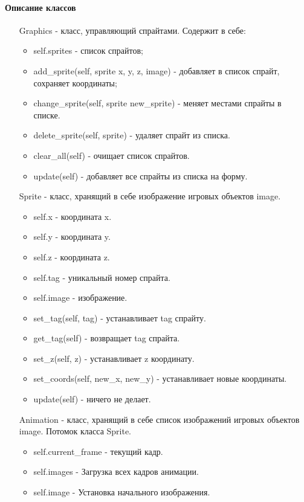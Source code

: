 \paragraph{Описание классов}
\begin{enumerate}
	\item[Graphics] - класс, управляющий спрайтами. Содержит в себе:
	\begin{itemize}
		\item self.sprites - список спрайтов;
		\item add\_sprite(self, sprite x, y, z, image) - добавляет в список спрайт, сохраняет координаты;
		\item change\_sprite(self, sprite new\_sprite) - меняет местами спрайты в списке.
		\item delete\_sprite(self, sprite) - удаляет спрайт из списка.
		\item clear\_all(self) - очищает список спрайтов.
		\item update(self) - добавляет все спрайты из списка на форму.
	\end{itemize}
	\item[Sprite] - класс, хранящий в себе изображение игровых объектов image.
	\begin{itemize}
		\item self.x - координата x.
		\item self.y - координата y.
		\item self.z - координата z.
		\item self.tag - уникальный номер спрайта.
		\item self.image - изображение.
		\item set\_tag(self, tag) - устанавливает tag спрайту.
		\item get\_tag(self) - возвращает tag спрайта.
		\item set\_z(self, z) - устанавливает z координату.
		\item set\_coords(self, new\_x, new\_y) - устанавливает новые координаты.
		\item update(self) - ничего не делает.
	\end{itemize}
	\item[Animation] - класс, хранящий в себе список изображений игровых объектов image. Потомок класса Sprite.
	\begin{itemize}
		\item self.current\_frame - текущий кадр.
		\item self.images  - Загрузка всех кадров анимации.
		\item self.image - Установка начального изображения.

\end{itemize}
\end{enumerate}
